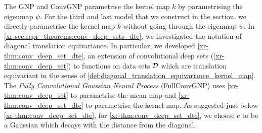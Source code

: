 \documentclass[12pt]{report}
\newcommand{\xrprefix}[1]{xr-#1}
\begin{document}
The GNP and ConvGNP parametrise the kernel map $k$ by parametrising the eigenmap $\psi$.
For the third and last model that we construct in the section, we directly parametrise the kernel map $k$ without going through the eigenmap $\psi$.
In \cref{\xrprefix{sec:repr_theorems:conv_deep_sets_dte}}, we investigated the notation of diagonal translation equivariance.
In particular, we developed \cref{\xrprefix{thm:conv_deep_set_dte}}, an extension of convolutional deep sets (\cref{\xrprefix{thm:conv_deep_set}}) to functions on data sets $\mathcal{D}$ which are translation equivariant in the sense of \cref{def:diagonal_translation_equivariance_kernel_map}.
The \emph{Fully Convolutional Gaussian Neural Process} (FullConvGNP) uses
\cref{\xrprefix{thm:conv_deep_set}} to parametrise the mean map
and \cref{\xrprefix{thm:conv_deep_set_dte}} to parametrise the kernel map.
As suggested just below \cref{\xrprefix{thm:conv_deep_set_dte}}, for \cref{\xrprefix{thm:conv_deep_set_dte}}, we choose $c$ to be a Gaussian which decays with the distance from the diagonal.
\end{document}
